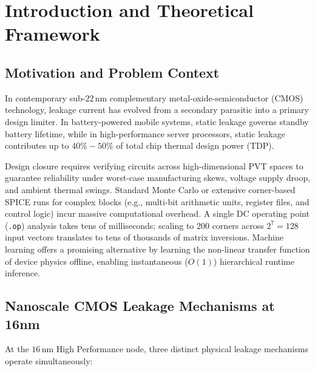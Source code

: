 \documentclass[11pt,a4paper]{article}
\begin{document}
\newpage
\tableofcontents
\newpage

\section{Introduction and Theoretical Framework}
\subsection{Motivation and Problem Context}
In contemporary sub-$22\,\text{nm}$ complementary metal-oxide-semiconductor (CMOS) technology, leakage current has evolved from a secondary parasitic into a primary design limiter. In battery-powered mobile systems, static leakage governs standby battery lifetime, while in high-performance server processors, static leakage contributes up to $40\%-50\%$ of total chip thermal design power (TDP).

Design closure requires verifying circuits across high-dimensional PVT spaces to guarantee reliability under worst-case manufacturing skews, voltage supply droop, and ambient thermal swings. Standard Monte Carlo or extensive corner-based SPICE runs for complex blocks (e.g., multi-bit arithmetic units, register files, and control logic) incur massive computational overhead. A single DC operating point (\texttt{.op}) analysis takes tens of milliseconds; scaling to 200 corners across $2^7 = 128$ input vectors translates to tens of thousands of matrix inversions. Machine learning offers a promising alternative by learning the non-linear transfer function of device physics offline, enabling instantaneous ($O(1)$) hierarchical runtime inference.

\subsection{Nanoscale CMOS Leakage Mechanisms at 16nm}
At the $16\,\text{nm}$ High Performance node, three distinct physical leakage mechanisms operate simultaneously:
\end{document}
